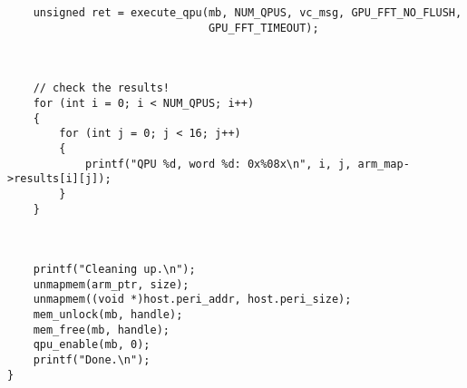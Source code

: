 \begin{lstlisting}
    unsigned ret = execute_qpu(mb, NUM_QPUS, vc_msg, GPU_FFT_NO_FLUSH,
                               GPU_FFT_TIMEOUT);



    // check the results!
    for (int i = 0; i < NUM_QPUS; i++)
    {
        for (int j = 0; j < 16; j++)
        {
            printf("QPU %d, word %d: 0x%08x\n", i, j, arm_map->results[i][j]);
        }
    }



    printf("Cleaning up.\n");
    unmapmem(arm_ptr, size);
    unmapmem((void *)host.peri_addr, host.peri_size);
    mem_unlock(mb, handle);
    mem_free(mb, handle);
    qpu_enable(mb, 0);
    printf("Done.\n");
}

\end{lstlisting}

\newpage

\section{} %



